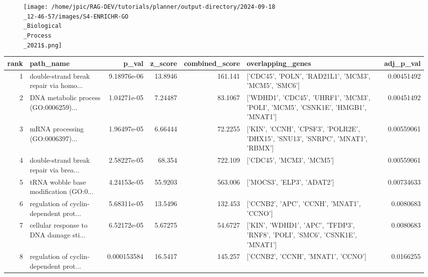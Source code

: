 \documentclass{article}
\begin{document}
\begin{figure}
    \centering
    \texttt{[image: /home/jpic/RAG-DEV/tutorials/planner/output-directory/2024-09-18\\\_12-46-57/images/S4-ENRICHR-GO\\\_Biological\\\_Process\\\_2021\$.png]}
\end{figure}



\begin{table}[h]
\centering
\begin{tabular}{rlrrrlr}
\hline
   rank & path\_name                              &       p\_val &   z\_score &   combined\_score & overlapping\_genes                                                               &   adj\_p\_val \\
\hline
      1 & double-strand break repair via homo... & 9.18976e-06 &  13.8946  &         161.141  & ['CDC45', 'POLN', 'RAD21L1', 'MCM3', 'MCM5', 'SMC6']                            &  0.00451492 \\
      2 & DNA metabolic process (GO:0006259)...  & 1.04271e-05 &   7.24487 &          83.1067 & ['WDHD1', 'CDC45', 'UHRF1', 'MCM3', 'POLI', 'MCM5', 'CSNK1E', 'HMGB1', 'MNAT1'] &  0.00451492 \\
      3 & mRNA processing (GO:0006397)...        & 1.96497e-05 &   6.66444 &          72.2255 & ['KIN', 'CCNH', 'CPSF3', 'POLR2E', 'DHX15', 'SNU13', 'SNRPC', 'MNAT1', 'RBMX']  &  0.00559061 \\
      4 & double-strand break repair via brea... & 2.58227e-05 &  68.354   &         722.109  & ['CDC45', 'MCM3', 'MCM5']                                                       &  0.00559061 \\
      5 & tRNA wobble base modification (GO:0... & 4.24153e-05 &  55.9203  &         563.006  & ['MOCS3', 'ELP3', 'ADAT2']                                                      &  0.00734633 \\
      6 & regulation of cyclin-dependent prot... & 5.68311e-05 &  13.5496  &         132.453  & ['CCNB2', 'APC', 'CCNH', 'MNAT1', 'CCNO']                                       &  0.0080683  \\
      7 & cellular response to DNA damage sti... & 6.52172e-05 &   5.67275 &          54.6727 & ['KIN', 'WDHD1', 'APC', 'TFDP3', 'RNF8', 'POLI', 'SMC6', 'CSNK1E', 'MNAT1']     &  0.0080683  \\
      8 & regulation of cyclin-dependent prot... & 0.000153584 &  16.5417  &         145.257  & ['CCNB2', 'CCNH', 'MNAT1', 'CCNO']                                              &  0.0166255  \\

\end{tabular}
\end{table}
\end{document}
